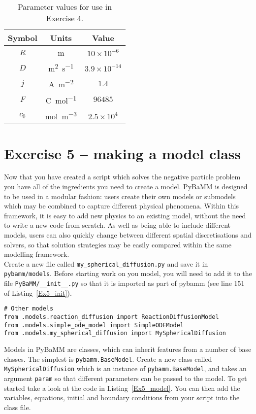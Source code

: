 \documentclass[a4paper,11pt]{article}
\begin{document}
\begin{table}[htb]
	\centering
	\begin{tabular}{c c c}
	\toprule
     Symbol & Units & Value \\
    \midrule
    $R$ & \si{m} & $10 \times 10^{-6}$\\
    $D$ & \si{m^2.s^{-1}} & $3.9 \times 10^{-14}$ \\
    $j$ & \si{A.m^{-2}} & $1.4$ \\
    $F$ & \si{C.mol^{-1}} & $96485$ \\
    $c_0$ & \si{mol.m^{-3}} & $2.5 \times 10^4$ \\
    \bottomrule
    \end{tabular}
    \caption{Parameter values for use in Exercise 4.}
    \label{Table:Ex4}
\end{table}

\pagebreak
\section*{Exercise 5 -- making a model class}
Now that you have created a script which solves the negative particle problem you have all of the ingredients you need to create a model. PyBaMM is designed to be used in a modular fashion: users create their own models or submodels which may be combined to capture different physical phenomena. Within this framework, it is easy to add new physics to an existing model, without the need to write a new code from scratch. As well as being able to include different models, users can also quickly change between different spatial discretisations and solvers, so that solution strategies may be easily compared within the same modelling framework. \\

Create a new file called \texttt{my\_spherical\_diffusion.py} and save it in \texttt{pybamm/models}. Before starting work on you model, you will need to add it to the file \texttt{PyBaMM/\_\_init\_\_.py} so that it is imported as part of pybamm (see line 151 of Listing~\ref{Ex5_init}).

\begin{lstlisting}[label={Ex5_init},caption=Adding you new model to the init file., firstnumber=148]
# Other models
from .models.reaction_diffusion import ReactionDiffusionModel
from .models.simple_ode_model import SimpleODEModel
from .models.my_spherical_diffusion import MySphericalDiffusion
\end{lstlisting}

Models in PyBaMM are classes, which can inherit features from a number of base classes. The simplest is \texttt{pybamm.BaseModel}. Create a new class called \texttt{MySphericalDiffusion} which is an instance of \texttt{pybamm.BaseModel}, and takes an argument \texttt{param} so that different parameters can be passed to the model. To get started take a look at the code in Listing~\ref{Ex5_model}. You can then add the variables, equations, initial and boundary conditions from your script into the class file.
\end{document}
